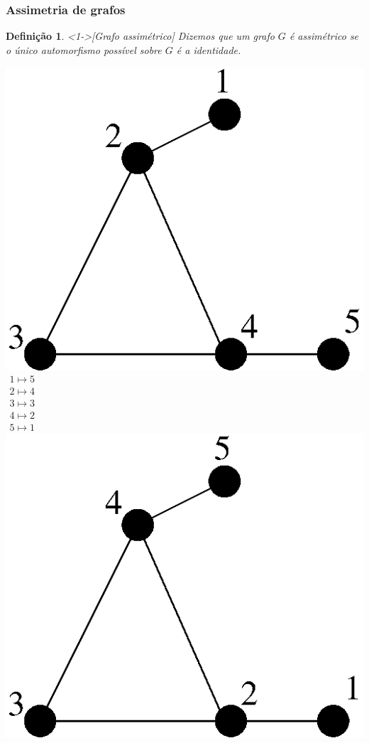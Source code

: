 \documentclass{beamer}
\theoremstyle{teoaxicorlem}
\theoremstyle{defnotnom}
\newtheorem{Def}{Definição}
\begin{document}
\begin{frame}
  \frametitle{Assimetria de grafos}
  \footnotesize
  \begin{Def}<1->[Grafo assimétrico]
    Dizemos que um grafo
    $G$ é  \alert{assimétrico} se o único automorfismo possível sobre
    $G$ é a identidade.
  \end{Def}
  \vfill
  \includegraphics[width=.2\paperwidth]{simetrico1.eps}
  \quad\pause
  $\begin{matrix}
    1 \mapsto 5 \\
    2 \mapsto 4 \\
    3 \mapsto 3 \\
    4 \mapsto 2 \\
    5 \mapsto 1
  \end{matrix}$
  \quad\pause
  \includegraphics[width=.2\paperwidth]{simetrico2.eps} \hfill\pause

\end{frame}
\end{document}
